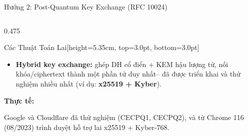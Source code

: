 \documentclass[aspectratio=169, 10pt]{beamer}
\begin{document}
\begin{frame}{Hướng 2: Post-Quantum Key Exchange (RFC 10024)}
\begin{columns}[T]
		\begin{column}{0.475\textwidth}
			\begin{accentcard}[uetgreen]{Các Thuật Toán Lai}[height=5.35cm, top=3.0pt, bottom=3.0pt]
				\raggedright
				\setlength{\leftmargini}{9pt}
				\begin{itemize}\setlength{\itemsep}{2.5pt}\setlength{\topsep}{0pt}\fontsize{5.8pt}{7.2pt}\selectfont
					\item \textbf{Hybrid key exchange:} ghép DH cổ điển + KEM hậu lượng tử, nối khóa/ciphertext thành một phần tử duy nhất-- đã được triển khai và thử nghiệm nhiều nhất (ví dụ: \textbf{\color{uetdarkgreen}x25519 + Kyber}).
				\end{itemize}
				\vspace{0.15cm}
				\begin{uetcard}[colback=uetgreenbg, height=2.45cm, top=3.0pt, bottom=3.0pt]
					\raggedright\fontsize{5.8pt}{7.2pt}\selectfont
					\textbf{\color{uetdarkgreen}Thực tế:}\par\vspace{2pt}
					Google và Cloudflare đã thử nghiệm (CECPQ1, CECPQ2), và từ Chrome 116 (08/2023) trình duyệt hỗ trợ lai x25519 + Kyber‑768.
				\end{uetcard}
			\end{accentcard}
		\end{column}
	\end{columns}
\end{frame}
\end{document}
